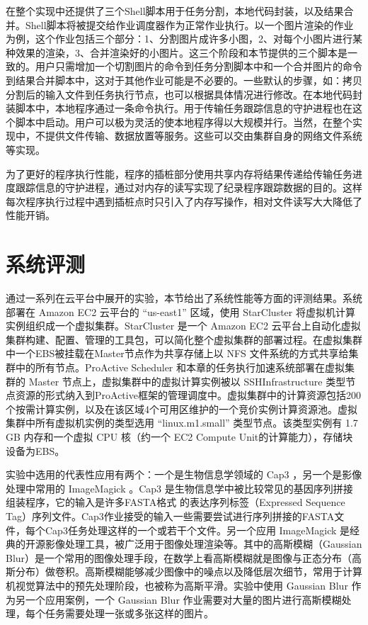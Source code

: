 在整个实现中还提供了三个Shell脚本用于任务分割，本地代码封装，以及结果合并。Shell脚本将被提交给作业调度器作为正常作业执行。以一个图片渲染的作业为例，这个作业包括三个部分：1、分割图片成许多小图，2、对每个小图片进行某种效果的渲染，3、合并渲染好的小图片。这三个阶段和本节提供的三个脚本是一致的。用户只需增加一个切割图片的命令到任务分割脚本中和一个合并图片的命令到结果合并脚本中，这对于其他作业可能是不必要的。一些默认的步骤，如：拷贝分割后的输入文件到任务执行节点，也可以根据具体情况进行修改。在本地代码封装脚本中，本地程序通过一条命令执行。用于传输任务跟踪信息的守护进程也在这个脚本中启动。用户可以极为灵活的使本地程序得以大规模并行。当然，在整个实现中，不提供文件传输、数据放置等服务。这些可以交由集群自身的网络文件系统等实现。

为了更好的程序执行性能，程序的插桩部分使用共享内存将结果传递给传输任务进度跟踪信息的守护进程，通过对内存的读写实现了纪录程序跟踪数据的目的。这样每次程序执行过程中遇到插桩点时只引入了内存写操作，相对文件读写大大降低了性能开销。

\section{系统评测}
\label{sec:no2_eval}
通过一系列在云平台中展开的实验，本节给出了系统性能等方面的评测结果。系统部署在 Amazon EC2 云平台的 ``us-east1'' 区域，使用 StarCluster \cite{starcluster} 将虚拟机计算实例组织成一个虚拟集群。StarCluster \cite{starcluster} 是一个 Amazon EC2 云平台上自动化虚拟集群构建、配置、管理的工具包，可以简化整个虚拟集群的部署过程。在虚拟集群中一个EBS被挂载在Master节点作为共享存储上以 NFS 文件系统的方式共享给集群中的所有节点。ProActive Scheduler 和本章的任务执行加速系统部署在虚拟集群的 Master 节点上，虚拟集群中的虚拟计算实例被以 SSHInfrastructure 类型节点资源的形式纳入到ProActive框架的管理调度中。虚拟集群中的计算资源包括200个按需计算实例，以及在该区域4个可用区维护的一个竞价实例计算资源池。虚拟集群中所有虚拟机实例的类型选用 ``linux.m1.small'' 类型节点。该类型实例有 1.7 GB 内存和一个虚拟 CPU 核（约一个 EC2 Compute Unit的计算能力），存储块设备为EBS。

实验中选用的代表性应用有两个：一个是生物信息学领域的 Cap3 \cite{Huang:1999:Cap3}，另一个是影像处理中常用的 ImageMagick \cite{imagemagick}。Cap3 是生物信息学中被比较常见的基因序列拼接组装程序，它的输入是许多FASTA格式 \cite{fasta} 的表达序列标签（Expressed Sequence Tag）序列文件。Cap3作业接受的输入一些需要尝试进行序列拼接的FASTA文件，每个Cap3任务处理这样的一个或若干个文件。另一个应用 ImageMagick 是经典的开源影像处理工具，被广泛用于图像处理渲染等。其中的高斯模糊（Gaussian Blur）是一个常用的图像处理手段，在数学上看高斯模糊就是图像与正态分布（高斯分布）做卷积。高斯模糊能够减少图像中的噪点以及降低层次细节，常用于计算机视觉算法中的预先处理阶段，也被称为高斯平滑。实验中使用 Gaussian Blur 作为另一个应用案例，一个 Gaussian Blur 作业需要对大量的图片进行高斯模糊处理，每个任务需要处理一张或多张这样的图片。

